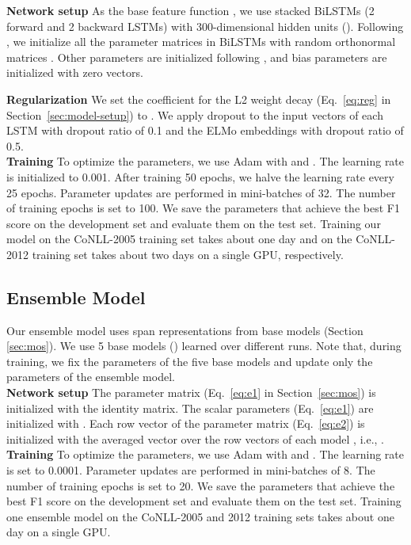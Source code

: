 \documentclass[11pt,a4paper]{article}
\begin{document}
\vspace{-0.3cm}
\noindent
{\bf Network setup} \hspace{0.2cm} As the base feature function , we use  stacked BiLSTMs (2 forward and 2 backward LSTMs) with 300-dimensional hidden units ().
Following , we initialize all the parameter matrices in BiLSTMs with random orthonormal matrices \cite{saxe:13}.
Other parameters are initialized following , and bias parameters are initialized with zero vectors.

\noindent
{\bf Regularization}\hspace{0.2cm} We set the coefficient  for the L2 weight decay (Eq.~\ref{eq:reg} in Section~\ref{sec:model-setup}) to .
We apply dropout \cite{srivastava:14} to the input vectors of each LSTM with dropout ratio of 0.1 and the ELMo embeddings with dropout ratio of 0.5.\\

\noindent
{\bf Training} \hspace{0.2cm} To optimize the parameters, we use Adam \cite{kingma:14} with  and .
The learning rate is initialized to 0.001.
After training 50 epochs, we halve the learning rate every 25 epochs.
Parameter updates are performed in mini-batches of 32.
The number of training epochs is set to 100.
We save the parameters that achieve the best F1 score on the development set and evaluate them on the test set.
Training our model on the CoNLL-2005 training set takes about one day and on the CoNLL-2012 training set takes about two days on a single GPU, respectively.

\subsection{\bf Ensemble Model}
Our ensemble model uses span representations  from base models  (Section \ref{sec:mos}).
We use 5 base models () learned over different runs.
Note that, during training, we fix the parameters of the five base models and update only the parameters of the ensemble model.\\

\noindent
{\bf Network setup} \hspace{0.2cm} The parameter matrix  (Eq.~\ref{eq:e1} in Section~\ref{sec:mos}) is initialized with the identity matrix.
The scalar parameters  (Eq.~\ref{eq:e1}) are initialized with .
Each row vector  of the parameter matrix   (Eq.~\ref{eq:e2}) is initialized with the averaged vector over the row vectors  of each model , i.e., .
\\

\noindent
{\bf Training} \hspace{0.2cm} To optimize the parameters, we use Adam with  and .
The learning rate is set to 0.0001.
Parameter updates are performed in mini-batches of 8.
The number of training epochs is set to 20.
We save the parameters that achieve the best F1 score on the development set and evaluate them on the test set.
Training one ensemble model on the CoNLL-2005 and 2012 training sets takes about one day on a single GPU.
\end{document}
